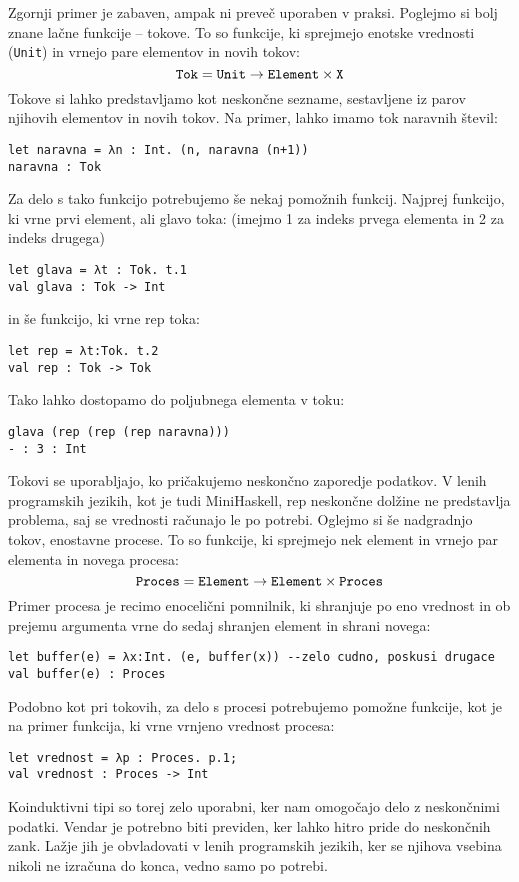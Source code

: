 \documentclass[12pt,a4paper,openany]{book}
\begin{document}
Zgornji primer je zabaven, ampak ni preveč uporaben v praksi. Poglejmo si bolj znane lačne funkcije -- tokove. To so funkcije, ki sprejmejo enotske vrednosti (\lstinline{Unit}) in vrnejo pare elementov in novih tokov:
\begin{equation}
    \mathtt{Tok} = \mathtt{Unit} \rightarrow \mathtt{Element} \times \mathtt{X} \notag
\end{equation}
Tokove si lahko predstavljamo kot neskončne sezname, sestavljene iz parov njihovih elementov in novih tokov. Na primer, lahko imamo tok naravnih števil:
\begin{lstlisting}
let naravna = λn : Int. (n, naravna (n+1))
naravna : Tok
\end{lstlisting}
Za delo s tako funkcijo potrebujemo še nekaj pomožnih funkcij. Najprej funkcijo, ki vrne prvi element, ali glavo toka: (imejmo 1 za indeks prvega elementa in 2 za indeks drugega)
\begin{lstlisting}
let glava = λt : Tok. t.1
val glava : Tok -> Int
\end{lstlisting}
in še funkcijo, ki vrne rep toka:
\begin{lstlisting}
let rep = λt:Tok. t.2
val rep : Tok -> Tok
\end{lstlisting}
Tako lahko dostopamo do poljubnega elementa v toku:
\begin{lstlisting}
glava (rep (rep (rep naravna)))
- : 3 : Int
\end{lstlisting}
Tokovi se uporabljajo, ko pričakujemo neskončno zaporedje podatkov. V lenih programskih jezikih, kot je tudi MiniHaskell, rep neskončne dolžine
ne predstavlja problema, saj se vrednosti računajo le po potrebi.
Oglejmo si še nadgradnjo tokov, enostavne procese. To so funkcije, ki sprejmejo nek element in vrnejo par elementa in novega procesa:
\begin{equation}
    \mathtt{Proces} = \mathtt{Element} \rightarrow \mathtt{Element} \times \mathtt{Proces} \notag
\end{equation}
Primer procesa je recimo enocelični pomnilnik, ki shranjuje po eno vrednost in ob prejemu argumenta vrne do sedaj shranjen element in shrani novega:
\begin{lstlisting}
let buffer(e) = λx:Int. (e, buffer(x)) --zelo cudno, poskusi drugace
val buffer(e) : Proces
\end{lstlisting}
Podobno kot pri tokovih, za delo s procesi potrebujemo pomožne funkcije, kot je na primer funkcija, ki vrne vrnjeno vrednost procesa:
\begin{lstlisting}
let vrednost = λp : Proces. p.1;
val vrednost : Proces -> Int
\end{lstlisting}
Koinduktivni tipi so torej zelo uporabni, ker nam omogočajo delo z neskončnimi podatki. Vendar je potrebno biti previden, ker lahko hitro pride do neskončnih zank. 
Lažje jih je obvladovati v lenih programskih jezikih, ker se njihova vsebina nikoli ne izračuna do konca, vedno samo po potrebi.
\end{document}
